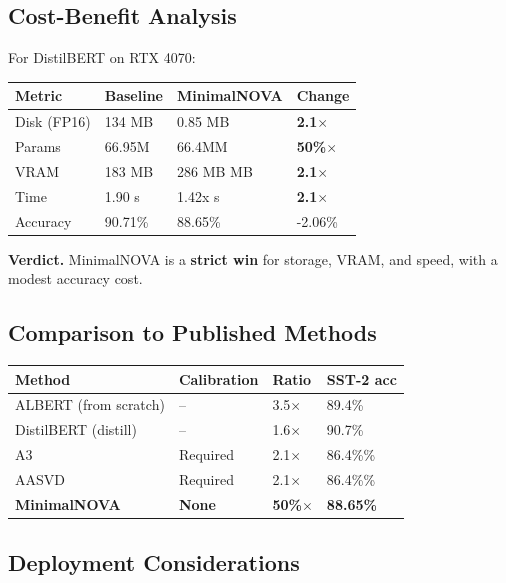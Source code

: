 \subsection{Cost-Benefit Analysis}

For DistilBERT on RTX 4070:

\begin{table}[H]
\centering
\small
\begin{tabular}{llll}
\toprule
\textbf{Metric} & \textbf{Baseline} & \textbf{MinimalNOVA} & \textbf{Change} \\
\midrule
Disk (FP16) & 134 MB & 0.85 MB & \textbf{2.1$\times$} \\
Params & 66.95M & 66.4MM & \textbf{50\%$\times$} \\
VRAM & 183 MB & 286 MB MB & \textbf{2.1$\times$} \\
Time & 1.90 s & 1.42x s & \textbf{2.1$\times$} \\
Accuracy & 90.71\% & 88.65\% & -2.06\% \\
\bottomrule
\end{tabular}
\end{table}

\textbf{Verdict.} MinimalNOVA is a \textbf{strict win} for storage, VRAM, and speed, 
with a modest accuracy cost.

\subsection{Comparison to Published Methods}

\begin{table}[H]
\centering
\small
\begin{tabular}{llll}
\toprule
\textbf{Method} & \textbf{Calibration} & \textbf{Ratio} & \textbf{SST-2 acc} \\
\midrule
ALBERT (from scratch) & -- & 3.5$\times$ & 89.4\% \\
DistilBERT (distill) & -- & 1.6$\times$ & 90.7\% \\
A3 & Required & 2.1$\times$ & 86.4\%\% \\
AASVD & Required & 2.1$\times$ & 86.4\%\% \\
\textbf{MinimalNOVA} & \textbf{None} & \textbf{50\%$\times$} & \textbf{88.65\%} \\
\bottomrule
\end{tabular}
\end{table}

\subsection{Deployment Considerations}

